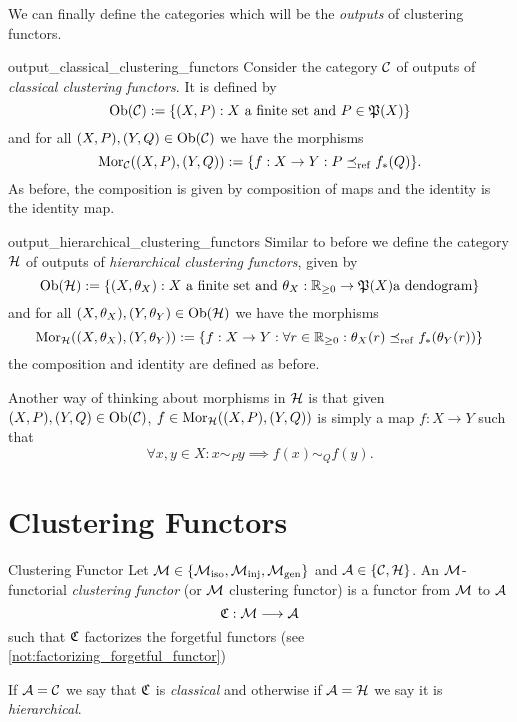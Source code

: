 We can finally define the categories which will be the \emph{outputs} of clustering functors.

\begin{definition}{}{output_classical_clustering_functors}
Consider the category $\mathcal{C}$ of outputs of \emph{classical clustering functors}. It is defined by
\begin{equation*}
    \mathrm {Ob}(\mathcal{C}) := \{(X, P): X \text{ a finite set and } P \in \mathfrak{P}(X)\}
\end{equation*}
and for all $(X,P), (Y,Q) \in \mathrm {Ob}(\mathcal{C})$ we have the morphisms
\begin{equation*}
    \mathrm {Mor}_{\mathcal{C}}((X,P), (Y,Q)) := \{f: X \to Y: P \preceq_\mathrm{ref} f_*(Q)\}.
\end{equation*}
As before, the composition is given by composition of maps and the identity is the identity map.
\end{definition}

\begin{definition}{}{output_hierarchical_clustering_functors}
Similar to before we define the category $\mathcal{H}$ of outputs of \emph{hierarchical clustering functors}, given by
\begin{equation*}
    \mathrm {Ob}(\mathcal{H}) := \{(X, \theta_X): X \text{ a finite set and } \theta_X: \mathbb R_{\geq0} \to \mathfrak{P}(X) \text{a dendogram}\}
\end{equation*}
and for all $(X, \theta_X), (Y, \theta_Y) \in \mathrm {Ob}(\mathcal{H})$ we have the morphisms
\begin{equation*}
    \mathrm {Mor}_{\mathcal{H}}((X, \theta_X), (Y,\theta_Y)) :=
    \left\{f: X \to Y: \forall r \in \mathbb R_{\geq0}: \theta_X(r) \preceq_\mathrm{ref} f_*(\theta_Y(r)) \right\}
\end{equation*}
the composition and identity are defined as before.
\end{definition}

Another way of thinking about morphisms in $\mathcal{H}$ is that given $(X,P), (Y,Q) \in \mathrm {Ob}(\mathcal{C})$, $f \in \mathrm {Mor}_{\mathcal{H}}((X,P), (Y,Q))$ is simply a map $f: X \to Y$ such that
$$
\forall x,y \in X: x \sim_P y \implies f(x) \sim_Q f(y).
$$

\section{Clustering Functors}
\begin{definition}{Clustering Functor}{}
Let $\mathcal{M} \in \{{\mathcal{M}_\mathrm{iso}}, {\mathcal{M}_\mathrm{inj}}, {\mathcal{M}_\mathrm{gen}}\}$ and $\mathcal{A} \in \{\mathcal{C}, \mathcal{H}\}$. An $\mathcal{M}$-functorial \emph{clustering functor} (or $\mathcal{M}$ clustering functor) is a functor from $\mathcal{M}$ to $\mathcal{A}$
$$\mathfrak{C} : \mathcal{M} \longrightarrow \mathcal{A}$$
such that $\mathfrak{C}$ factorizes the forgetful functors (see \ref{not:factorizing_forgetful_functor}) \par

\medskip If $\mathcal{A} = \mathcal{C}$ we say that $\mathfrak{C}$ is \emph{classical} and otherwise if $\mathcal{A} = \mathcal{H}$ we say it is \emph{hierarchical}.
\end{definition}

